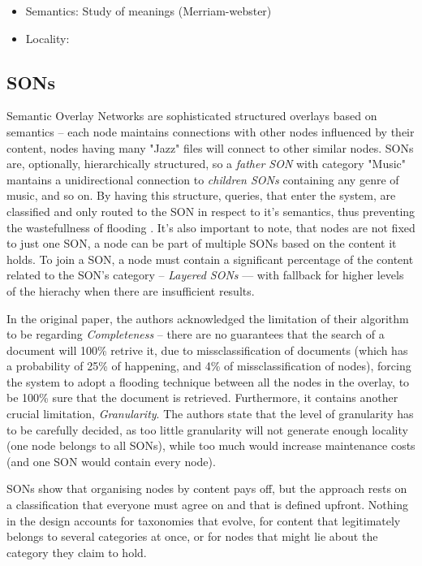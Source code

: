 \begin{itemize}
    \item  Semantics: Study of meanings (Merriam-webster)
    \item Locality: 
\end{itemize}


\subsection{SONs}
\label{sec:SONs}
Semantic Overlay Networks are sophisticated structured overlays based on semantics – each node maintains connections with other nodes influenced by their content, nodes having many "Jazz" files will connect to other similar nodes. SONs are, optionally, hierarchically structured, so a \textit{father SON} with category "Music" mantains a unidirectional connection to \textit{children SONs} containing any genre of music, and so on. By having this structure, queries, that enter the system, are classified and only routed to the SON in respect to it's semantics, thus preventing the wastefullness of flooding \cite{crespo2005sons}. It's also important to note, that nodes are not fixed to just one SON, a node can be part of multiple SONs based on the content it holds. To join a SON, a node must contain a significant percentage of the content related to the SON's category – \textit{Layered SONs} — with fallback for higher levels of the hierachy when there are insufficient results.

In the original paper, the authors acknowledged the limitation of their algorithm to be regarding \textit{Completeness} – there are no guarantees that the search of a document will 100\% retrive it, due to missclassification of documents (which has a probability of 25\% of happening, and 4\% of missclassification of nodes), forcing the system to adopt a flooding technique between all the nodes in the overlay, to be 100\% sure that the document is retrieved. Furthermore, it contains another crucial limitation, \textit{Granularity}. The authors state that the level of granularity has to be carefully decided, as too little granularity will not generate enough locality (one node belongs to all SONs), while too much would increase maintenance costs (and one SON would contain every node).

SONs show that organising nodes by content pays off, but the approach rests on a classification that everyone must agree on and that is defined upfront. Nothing in the design accounts for taxonomies that evolve, for content that legitimately belongs to several categories at once, or for nodes that might lie about the category they claim to hold.

